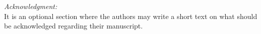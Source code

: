 \documentclass{wseas}
\begin{document}
\flushleft \par{\textit {Acknowledgment:}}\\
It is an optional section where the authors may write a short text on what should be acknowledged regarding their manuscript.


\end{document}

